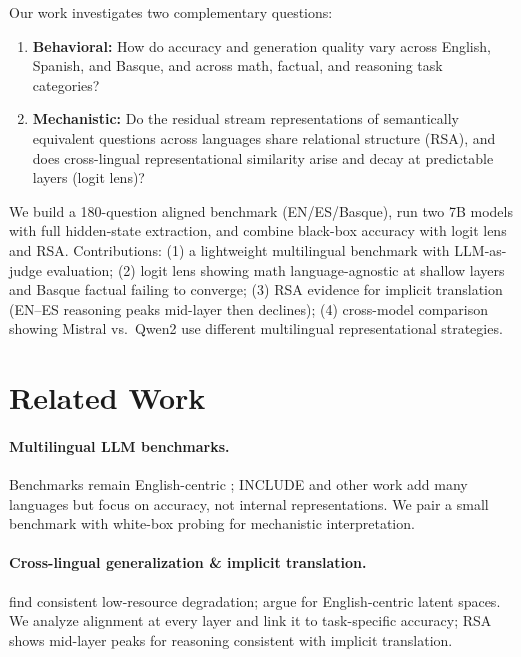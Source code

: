 \documentclass[10pt]{article}
\begin{document}
Our work investigates two complementary questions:
\begin{enumerate}[leftmargin=*,itemsep=0pt]
  \item \textbf{Behavioral:} How do accuracy and generation quality vary across English,
  Spanish, and Basque, and across math, factual, and reasoning task categories?
  \item \textbf{Mechanistic:} Do the residual stream representations of semantically
  equivalent questions across languages share relational structure (RSA), and does
  cross-lingual representational similarity arise and decay at predictable layers
  (logit lens)?
\end{enumerate}

We build a 180-question aligned benchmark (EN/ES/Basque), run two 7B models with full hidden-state extraction, and combine black-box accuracy with logit lens and RSA. Contributions: (1) a lightweight multilingual benchmark with LLM-as-judge evaluation; (2) logit lens showing math language-agnostic at shallow layers and Basque factual failing to converge; (3) RSA evidence for implicit translation (EN--ES reasoning peaks mid-layer then declines); (4) cross-model comparison showing Mistral vs.\ Qwen2 use different multilingual representational strategies.

\section{Related Work}

\paragraph{Multilingual LLM benchmarks.}
Benchmarks remain English-centric \citep{hendrycks2020measuring}; INCLUDE \citep{include2024} and other work add many languages but focus on accuracy, not internal representations. We pair a small benchmark with white-box probing for mechanistic interpretation.

\paragraph{Cross-lingual generalization \& implicit translation.}
\citet{ahuja2023mega} find consistent low-resource degradation; \citet{wendler2024llamas} argue for English-centric latent spaces. We analyze alignment at every layer and link it to task-specific accuracy; RSA shows mid-layer peaks for reasoning consistent with implicit translation.
\end{document}
